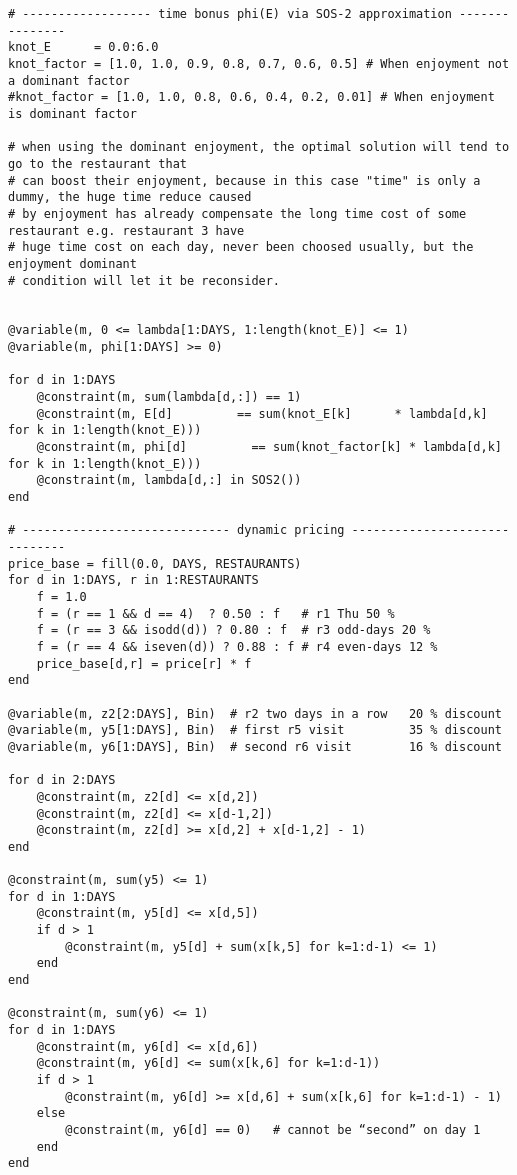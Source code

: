 \begin{verbatim}
# ------------------ time bonus phi(E) via SOS‑2 approximation ---------------
knot_E      = 0.0:6.0
knot_factor = [1.0, 1.0, 0.9, 0.8, 0.7, 0.6, 0.5] # When enjoyment not a dominant factor
#knot_factor = [1.0, 1.0, 0.8, 0.6, 0.4, 0.2, 0.01] # When enjoyment is dominant factor 

# when using the dominant enjoyment, the optimal solution will tend to go to the restaurant that 
# can boost their enjoyment, because in this case "time" is only a dummy, the huge time reduce caused 
# by enjoyment has already compensate the long time cost of some restaurant e.g. restaurant 3 have 
# huge time cost on each day, never been choosed usually, but the enjoyment dominant 
# condition will let it be reconsider.


@variable(m, 0 <= lambda[1:DAYS, 1:length(knot_E)] <= 1)
@variable(m, phi[1:DAYS] >= 0)

for d in 1:DAYS
    @constraint(m, sum(lambda[d,:]) == 1)
    @constraint(m, E[d]         == sum(knot_E[k]      * lambda[d,k] for k in 1:length(knot_E)))
    @constraint(m, phi[d]         == sum(knot_factor[k] * lambda[d,k] for k in 1:length(knot_E)))
    @constraint(m, lambda[d,:] in SOS2())
end 

# ----------------------------- dynamic pricing ------------------------------
price_base = fill(0.0, DAYS, RESTAURANTS)
for d in 1:DAYS, r in 1:RESTAURANTS
    f = 1.0
    f = (r == 1 && d == 4)  ? 0.50 : f   # r1 Thu 50 %
    f = (r == 3 && isodd(d)) ? 0.80 : f  # r3 odd‑days 20 %
    f = (r == 4 && iseven(d)) ? 0.88 : f # r4 even‑days 12 %
    price_base[d,r] = price[r] * f
end

@variable(m, z2[2:DAYS], Bin)  # r2 two days in a row   20 % discount
@variable(m, y5[1:DAYS], Bin)  # first r5 visit         35 % discount 
@variable(m, y6[1:DAYS], Bin)  # second r6 visit        16 % discount

for d in 2:DAYS
    @constraint(m, z2[d] <= x[d,2])
    @constraint(m, z2[d] <= x[d-1,2])
    @constraint(m, z2[d] >= x[d,2] + x[d-1,2] - 1)
end

@constraint(m, sum(y5) <= 1)
for d in 1:DAYS
    @constraint(m, y5[d] <= x[d,5])
    if d > 1
        @constraint(m, y5[d] + sum(x[k,5] for k=1:d-1) <= 1)
    end
end

@constraint(m, sum(y6) <= 1)
for d in 1:DAYS
    @constraint(m, y6[d] <= x[d,6])
    @constraint(m, y6[d] <= sum(x[k,6] for k=1:d-1))
    if d > 1
        @constraint(m, y6[d] >= x[d,6] + sum(x[k,6] for k=1:d-1) - 1)
    else
        @constraint(m, y6[d] == 0)   # cannot be “second” on day 1
    end
end


\end{verbatim}
